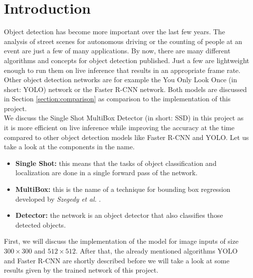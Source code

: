 
\section{Introduction}
\label{section:introduction}

Object detection has become more important over the last few years. The analysis of street scenes for autonomous driving or the counting of people at an event are just a few of many applications. By now, there are many different algorithms and concepts for object detection published. Just a few are lightweight enough to run them on live inference that results in an appropriate frame rate. Other object detection networks are for example the You Only Look Once (in short: YOLO) network or the Faster R-CNN \cite{fasterrcnn2015} network. Both models are discussed in Section \ref{section:comparison} as comparison to the implementation of this project. \\

We discuss the Single Shot MultiBox Detector (in short: SSD) \cite{ssd2016} in this project as it is more efficient on live inference while improving the accuracy at the time compared to other object detection models like Faster R-CNN and YOLO. Let us take a look at the components in the name.
\begin{itemize}
  \item \textbf{Single Shot:} this means that the tasks of object classification and localization are done in a single forward pass of the network.
  \item \textbf{MultiBox:} this is the name of a technique for bounding box regression developed by \textit{Szegedy et al.} \cite{multibox2014}.
  \item \textbf{Detector:} the network is an object detector that also classifies those detected objects.
\end{itemize}

First, we will discuss the implementation of the model for image inputs of size $300 \times 300$ and $512 \times 512$. After that, the already mentioned algorithms YOLO and Faster R-CNN are shortly described before we will take a look at some results given by the trained network of this project.
